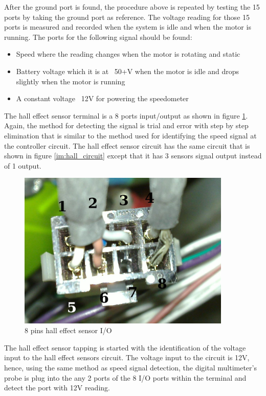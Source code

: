 After the ground port is found, the procedure above is repeated by testing the 15 ports by taking the ground port as reference. The voltage reading for those 15 ports is measured and recorded when the system is idle and when the motor is running. The ports for the following signal should be found:

\begin{itemize}
	\item{Speed where the reading changes when the motor is rotating and static}
	\item{Battery voltage which it is at ~50+V when the motor is idle and drops slightly when the motor is running}
	\item{A constant voltage ~12V for powering the speedometer}
\end{itemize}

The hall effect sensor terminal is a 8 ports input/output as shown in figure \ref{im:hall8pin}. Again, the method for detecting the signal is trial and error with step by step elimination that is similar to the method used for identifying the speed signal at the controller circuit. The hall effect sensor circuit has the same circuit that is shown in figure \ref{im:hall_circuit} except that it has 3 sensors signal output instead of 1 output. 

\begin{figure} [htb]
	\centering
	\includegraphics[width=4in]{images/hall.jpg}
	\caption{8 pins hall effect sensor I/O}
	\label{im:hall8pin}
\end{figure}

The hall effect sensor tapping is started with the identification of the voltage input to the hall effect sensors circuit. The voltage input to the circuit is 12V, hence, using the same method as speed signal detection, the digital multimeter's probe is plug into the any 2 ports of the 8 I/O ports within the terminal and detect the port with 12V reading.

